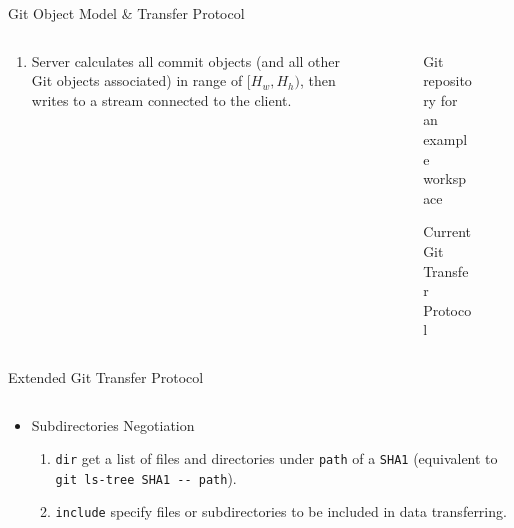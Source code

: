 \documentclass[final]{beamer}
\begin{document}
\begin{frame}[t, fragile]
\begin{columns}[t]
\begin{column}{.49\linewidth}
\begin{block}{Git Object Model \& Transfer Protocol}
\begin{columns}[T]
\begin{column}{.5\textwidth}
\begin{enumerate}
  \item Server calculates all commit objects (and all other Git objects
    associated) in range of $[H_w, H_h)$, then writes to a stream connected to
    the client.
\end{enumerate}
          \end{column}
          \begin{column}{.5\textwidth}
              \begin{figure}\centering
                \caption{Git repository for an example workspace}
              \end{figure}
            \begin{figure} \centering
              \caption{Current Git Transfer Protocol}
            \end{figure}
          \end{column}
        \end{columns}
      \end{block}
      \begin{block}{Extended Git Transfer Protocol}

        \begin{columns}[T]
          \begin{column}{.5\textwidth}
\begin{itemize}
    \justifying
  \item Subdirectories Negotiation
    \begin{enumerate}
  \item \verb|dir| get a list of files and directories under \verb|path| of a
    \verb|SHA1| (equivalent to \verb|git ls-tree SHA1 -- path|).

  \item \verb|include| specify files or subdirectories to be included in data
    transferring.


\end{enumerate}
\end{itemize}
\end{column}
\end{columns}
\end{block}
\end{column}
\end{columns}
\end{frame}
\end{document}
